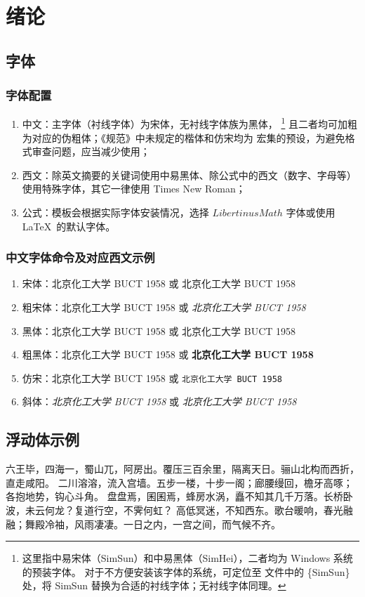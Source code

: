\chapter{绪论}
\section{字体}
\subsection{字体配置}
\begin{enumerate}
	\item 中文：主字体（衬线字体）为宋体，无衬线字体族为黑体，%
	\footnote{这里指中易宋体（SimSun）和中易黑体（SimHei），二者均为 Windows 系统的预装字体。
	对于不方便安装该字体的系统，可定位至 
	文件中的 \{SimSun\} 处，将 SimSun 替换为合适的衬线字体；无衬线字体同理。}
	且二者均可加粗为对应的伪粗体；《规范》中未规定的楷体和仿宋均为  宏集的预设，为避免格式审查问题，应当减少使用；
	\item 西文：除英文摘要的关键词使用中易黑体、除公式中的西文（数字、字母等）使用特殊字体，其它一律使用 Times New Roman；
	\item 公式：模板会根据实际字体安装情况，选择 $LibertinusMath$ 字体或使用 \LaTeX\ 的默认字体。
\end{enumerate}

\subsection{中文字体命令及对应西文示例}
\begin{enumerate}
	\item 宋体：北京化工大学 BUCT 1958 或 \textrm{北京化工大学 BUCT 1958}
	\item 粗宋体：{\bfsong 北京化工大学 BUCT 1958} 或 \emph{北京化工大学 BUCT 1958}
	\item 黑体：{\heiti 北京化工大学 BUCT 1958} 或 \textsf{北京化工大学 BUCT 1958}
	\item 粗黑体：{\bfhei 北京化工大学 BUCT 1958} 或 \textsf{\bfseries 北京化工大学 BUCT 1958}
	\item 仿宋：{\ttfamily 北京化工大学 BUCT 1958} 或 \texttt{北京化工大学 BUCT 1958}
	\item 斜体：{\itshape 北京化工大学 BUCT 1958} 或 \textit{北京化工大学 BUCT 1958}
\end{enumerate}

\section{浮动体示例}
六王毕，四海一，蜀山兀，阿房出。覆压三百余里，隔离天日。骊山北构而西折，直走咸阳。
二川溶溶，流入宫墙。五步一楼，十步一阁；廊腰缦回，檐牙高啄；各抱地势，钩心斗角。
盘盘焉，囷囷焉，蜂房水涡，矗不知其几千万落。长桥卧波，未云何龙？复道行空，不霁何虹？
高低冥迷，不知西东。歌台暖响，春光融融；舞殿冷袖，风雨凄凄。一日之内，一宫之间，而气候不齐。

